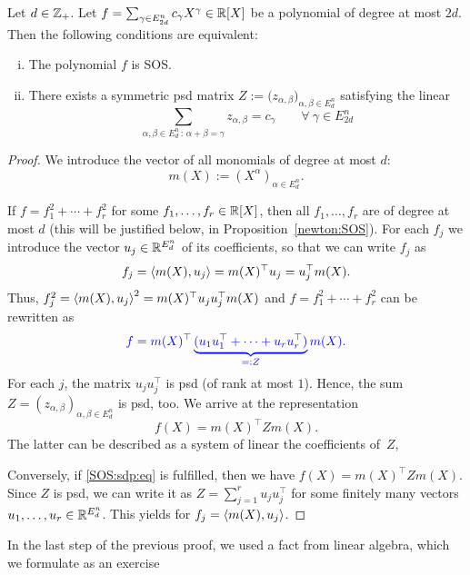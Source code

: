 \begin{proposition}
	\label{sos:as:sdp:feasibility}
	Let $d \in \mathbb{Z}_+$. Let $f = \sum_{ \gamma \in E_{2d}^n} c_\gamma X^\gamma \in \mathbb{R}[X]$ be a polynomial of degree at most $2d$. Then the following conditions are equivalent:
	\begin{enumerate}[(i)]
		\item The polynomial $f$ is SOS. 
		\item There exists a symmetric psd matrix $Z:= \bigl(z_{\alpha,\beta})_{\alpha,\beta \in E_d^n}$ satisfying the linear   
		\begin{equation}
			\sum_{\alpha, \beta \in E_d^n \, : \, \alpha + \beta = \gamma} z_{\alpha, \beta} = c_\gamma \qquad \forall \ \gamma \in E_{2 d}^n \label{SOS:sdp:eq}
		\end{equation}
	\end{enumerate}
\end{proposition}
\begin{proof}
	We introduce the vector of all monomials of degree at most $d$: 
	\[
		m(X):=(X^\alpha)_{\alpha \in E_d^n}.
	\]
	
	If $f = f_1^2 + \cdots + f_r^2$ for some $f_1,\ldots,f_r \in \mathbb{R}[X]$, then all $f_1,\ldots,f_r$ are of degree at most $d$ (this will be justified below, in Proposition~\ref{newton:SOS}). For each $f_j$ we introduce the vector $u_j \in \mathbb{R}^{E_d^n}$ of its coefficients, so that we can write $f_j$ as 
	\[
		f_j = \left\langle m(X) , u_j \right\rangle = m(X)^\top u_j = u_j^\top m(X).
	\]
	Thus, $f_j^2 = \left\langle m(X) , u_j \right\rangle^2 = m(X)^\top u_j u_j^\top m(X)$ and $f=f_1^2 + \cdots + f_r^2$ can be rewritten as 
	\[ 
		\textcolor{blue}{f = m(X)^\top \underbrace{(u_1 u_1^\top + \cdots + u_r u_r^\top )}_{=:Z} m(X).}
	\]
	For each $j$, the matrix $u_j u_j^\top$ is psd (of rank at most $1$). Hence, the sum $Z = (z_{\alpha,\beta})_{\alpha,\beta \in E_d^n}$ is psd, too. We arrive at the representation 
	\[
		f(X) = m(X)^\top Z m(X).
	\]
	The latter can be described as a system of linear   the coefficients of~$Z$,  
	
	Conversely, if \eqref{SOS:sdp:eq} is fulfilled, then we have $f(X)= m(X)^\top Z m(X)$. Since $Z$ is psd, we can write it as $Z = \sum_{j=1}^r u_j u_j^\top$ for some finitely many vectors $u_1,\ldots,u_r \in \mathbb{R}^{E_d^n}$. This yields  for $f_j = \left\langle m(X) , u_j \right\rangle$. 
\end{proof}

In the last step of the previous proof, we used a fact from linear algebra, which we formulate as an exercise

